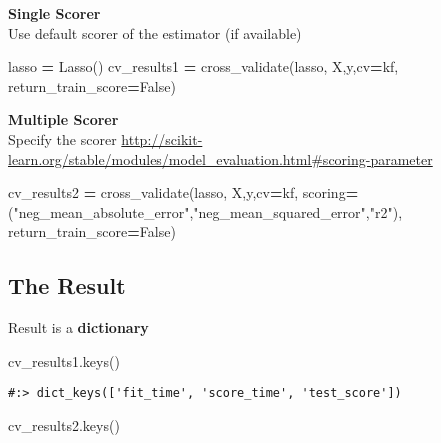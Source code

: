 \documentclass[
]{book}
\newenvironment{Shaded}{\begin{snugshade}}{\end{snugshade}}
\newcommand{\NormalTok}[1]{#1}
\newcommand{\OperatorTok}[1]{\textcolor[rgb]{0.43,0.43,0.43}{\textbf{#1}}}
\newcommand{\StringTok}[1]{\textcolor[rgb]{0.5,0.5,0.5}{#1}}
\newcommand{\VariableTok}[1]{\textcolor[rgb]{0,0,0}{#1}}
\begin{document}
\textbf{Single Scorer}\\
Use default scorer of the estimator (if available)

\begin{Shaded}
\begin{Highlighting}[]
\NormalTok{lasso }\OperatorTok{=}\NormalTok{ Lasso()}
\NormalTok{cv\_results1 }\OperatorTok{=}\NormalTok{ cross\_validate(lasso, X,y,cv}\OperatorTok{=}\NormalTok{kf,}
\NormalTok{    return\_train\_score}\OperatorTok{=}\VariableTok{False}\NormalTok{)}
\end{Highlighting}
\end{Shaded}

\textbf{Multiple Scorer}\\
Specify the scorer \url{http://scikit-learn.org/stable/modules/model_evaluation.html\#scoring-parameter}

\begin{Shaded}
\begin{Highlighting}[]
\NormalTok{cv\_results2 }\OperatorTok{=}\NormalTok{ cross\_validate(lasso, X,y,cv}\OperatorTok{=}\NormalTok{kf,}
\NormalTok{    scoring}\OperatorTok{=}\NormalTok{(}\StringTok{"neg\_mean\_absolute\_error"}\NormalTok{,}\StringTok{"neg\_mean\_squared\_error"}\NormalTok{,}\StringTok{"r2"}\NormalTok{),}
\NormalTok{    return\_train\_score}\OperatorTok{=}\VariableTok{False}\NormalTok{)}
\end{Highlighting}
\end{Shaded}

\hypertarget{the-result}{%
\subsection{The Result}\label{the-result}}

Result is a \textbf{dictionary}

\begin{Shaded}
\begin{Highlighting}[]
\NormalTok{cv\_results1.keys()}
\end{Highlighting}
\end{Shaded}

\begin{verbatim}
#:> dict_keys(['fit_time', 'score_time', 'test_score'])
\end{verbatim}

\begin{Shaded}
\begin{Highlighting}[]
\NormalTok{cv\_results2.keys()}
\end{Highlighting}
\end{Shaded}
\end{document}
